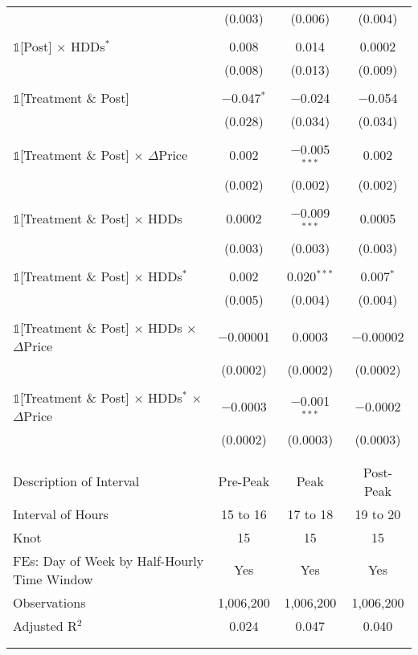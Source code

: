 {\begin{table}[t!]
\begin{ThreePartTable}
\begin{longtable}{@{\extracolsep{40pt}}lccc}
                & (0.003) & (0.006) & (0.004) \\
                & & & \\
                $\mathbb{1}$[Post] $\times$ HDDs$^{*}$ & 0.008 & 0.014 & 0.0002 \\
                & (0.008) & (0.013) & (0.009) \\
                & & & \\
                $\mathbb{1}$[Treatment \& Post] & $-$0.047$^{*}$ & $-$0.024 & $-$0.054 \\
                & (0.028) & (0.034) & (0.034) \\
                & & & \\
                $\mathbb{1}$[Treatment \& Post] $\times$ $\Delta$Price & 0.002 & $-$0.005$^{***}$ & 0.002 \\
                & (0.002) & (0.002) & (0.002) \\
                & & & \\
                $\mathbb{1}$[Treatment \& Post] $\times$ HDDs & 0.0002 & $-$0.009$^{***}$ & 0.0005 \\
                & (0.003) & (0.003) & (0.003) \\
                & & & \\
                $\mathbb{1}$[Treatment \& Post] $\times$ HDDs$^{*}$ & 0.002 & 0.020$^{***}$ & 0.007$^{*}$ \\
                & (0.005) & (0.004) & (0.004) \\
                & & & \\
                $\mathbb{1}$[Treatment \& Post] $\times$ HDDs $\times$ $\Delta$Price & $-$0.00001 & 0.0003 & $-$0.00002 \\
                & (0.0002) & (0.0002) & (0.0002) \\
                & & & \\
                $\mathbb{1}$[Treatment \& Post] $\times$ HDDs$^{*}$ $\times$ $\Delta$Price & $-$0.0003 & $-$0.001$^{***}$ & $-$0.0002 \\
                & (0.0002) & (0.0003) & (0.0003) \\
                & & & \\
                \hline
                \\[-2.0ex]
                Description of Interval & Pre-Peak & Peak & Post-Peak \\
                Interval of Hours & 15 to 16 & 17 to 18 & 19 to 20 \\
                Knot & 15 & 15 & 15 \\
                FEs: Day of Week by Half-Hourly Time Window & Yes & Yes & Yes \\
                Observations & 1,006,200 & 1,006,200 & 1,006,200 \\
                Adjusted R$^{2}$ & 0.024 & 0.047 & 0.040 \\
                \\[-2.0ex]
                \hline \hline
                \\[-4.5ex]


\end{longtable}
\end{ThreePartTable}
\end{table}}
